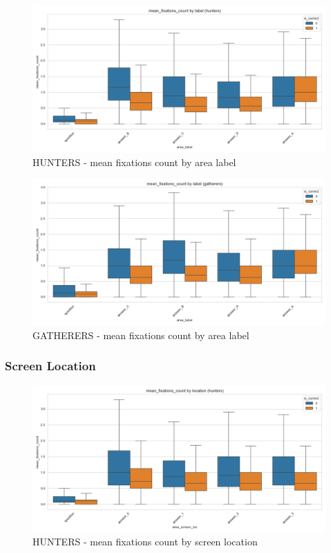 \documentclass{article}
\begin{document}
\begin{figure}[H]
    \centering
    \includegraphics[width=0.8\linewidth]{plots/boxplots/boxplot_area_label_mean_fixations_count_hunters.png}
    \caption{HUNTERS - mean fixations count by area label}
    \label{fig:fc_hunt_al}
\end{figure}

\begin{figure}[H]
    \centering
    \includegraphics[width=0.8\linewidth]{plots/boxplots/boxplot_area_label_mean_fixations_count_gatherers.png}
    \caption{GATHERERS - mean fixations count by area label}
    \label{fig:fc_gath_al}
\end{figure}

\subsubsection{Screen Location}

\begin{figure}[H]
    \centering
    \includegraphics[width=0.8\linewidth]{plots/boxplots/boxplot_area_screen_loc_mean_fixations_count_hunters.png}
    \caption{HUNTERS - mean fixations count by screen location}
    \label{fig:fc_hunt_sl}
\end{figure}
\end{document}
